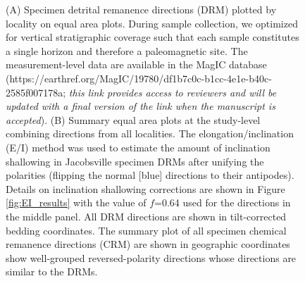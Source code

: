 \documentclass[draft]{agujournal2019}
\begin{document}
\begin{figure}[h!]
\caption{(A) Specimen detrital remanence directions (DRM) plotted by locality on equal area plots. During sample collection, we optimized for vertical stratigraphic coverage such that each sample constitutes a single horizon and therefore a paleomagnetic site. The measurement-level data are available in the MagIC database (https://earthref.org/MagIC/19780/df1b7c0c-b1cc-4e1e-b40c-2585f007178a; \textit{this link provides access to reviewers and will be updated with a final version of the link when the manuscript is accepted}). (B) Summary equal area plots at the study-level combining directions from all localities. The elongation/inclination (E/I) method \cite{Tauxe2004b} was used to estimate the amount of inclination shallowing in Jacobsville specimen DRMs after unifying the polarities (flipping the normal [blue] directions to their antipodes). Details on inclination shallowing corrections are shown in Figure \ref{fig:EI_results} with the value of $f$=0.64 used for the directions in the middle panel. All DRM directions are shown in tilt-corrected bedding coordinates. The summary plot of all specimen chemical remanence directions (CRM) are shown in geographic coordinates show well-grouped reversed-polarity directions whose directions are similar to the DRMs. }
\label{fig:in_situ_pmag}
\end{figure}
\end{document}
